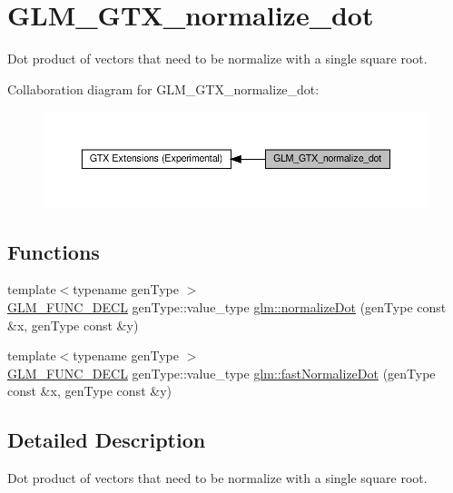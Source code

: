 \hypertarget{group__gtx__normalize__dot}{}\section{G\+L\+M\+\_\+\+G\+T\+X\+\_\+normalize\+\_\+dot}
\label{group__gtx__normalize__dot}


Dot product of vectors that need to be normalize with a single square root.  


Collaboration diagram for G\+L\+M\+\_\+\+G\+T\+X\+\_\+normalize\+\_\+dot\+:\nopagebreak
\begin{figure}[H]
\begin{center}
\leavevmode
\includegraphics[width=350pt]{group__gtx__normalize__dot}
\end{center}
\end{figure}
\subsection*{Functions}
\begin{DoxyCompactItemize}
\item 
{\footnotesize template$<$typename gen\+Type $>$ }\\\hyperlink{setup_8hpp_ab2d052de21a70539923e9bcbf6e83a51}{G\+L\+M\+\_\+\+F\+U\+N\+C\+\_\+\+D\+E\+CL} gen\+Type\+::value\+\_\+type \hyperlink{group__gtx__normalize__dot_ga13b81f0882c1811cb6c99a5864b9c152}{glm\+::normalize\+Dot} (gen\+Type const \&x, gen\+Type const \&y)
\item 
{\footnotesize template$<$typename gen\+Type $>$ }\\\hyperlink{setup_8hpp_ab2d052de21a70539923e9bcbf6e83a51}{G\+L\+M\+\_\+\+F\+U\+N\+C\+\_\+\+D\+E\+CL} gen\+Type\+::value\+\_\+type \hyperlink{group__gtx__normalize__dot_gaeb26ec35a51c30dbd0d91f9da45eeafe}{glm\+::fast\+Normalize\+Dot} (gen\+Type const \&x, gen\+Type const \&y)
\end{DoxyCompactItemize}


\subsection{Detailed Description}
Dot product of vectors that need to be normalize with a single square root. 

